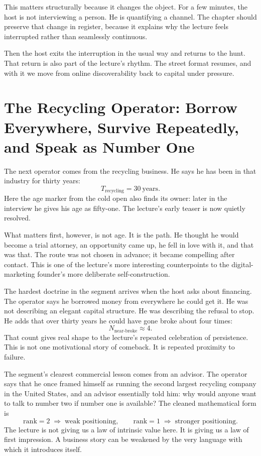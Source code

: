 This matters structurally because it changes the object. For a few minutes, the host is not interviewing a person. He is quantifying a channel. The chapter should preserve that change in register, because it explains why the lecture feels interrupted rather than seamlessly continuous.

Then the host exits the interruption in the usual way and returns to the hunt. That return is also part of the lecture's rhythm. The street format resumes, and with it we move from online discoverability back to capital under pressure.

\section{The Recycling Operator: Borrow Everywhere, Survive Repeatedly, and Speak as Number One}

The next operator comes from the recycling business. He says he has been in that industry for thirty years:
\begin{equation}
T_{\text{recycling}} = 30\ \text{years}.
\end{equation}
Here the age marker from the cold open also finds its owner: later in the interview he gives his age as fifty-one. The lecture's early teaser is now quietly resolved.

What matters first, however, is not age. It is the path. He thought he would become a trial attorney, an opportunity came up, he fell in love with it, and that was that. The route was not chosen in advance; it became compelling after contact. This is one of the lecture's more interesting counterpoints to the digital-marketing founder's more deliberate self-construction.

The hardest doctrine in the segment arrives when the host asks about financing. The operator says he borrowed money from everywhere he could get it. He was not describing an elegant capital structure. He was describing the refusal to stop. He adds that over thirty years he could have gone broke about four times:
\begin{equation}
N_{\text{near-broke}} \approx 4.
\end{equation}
That count gives real shape to the lecture's repeated celebration of persistence. This is not one motivational story of comeback. It is repeated proximity to failure.

The segment's clearest commercial lesson comes from an advisor. The operator says that he once framed himself as running the second largest recycling company in the United States, and an advisor essentially told him: why would anyone want to talk to number two if number one is available? The cleaned mathematical form is
\begin{equation}
\text{rank}=2 \;\Rightarrow\; \text{weak positioning},
\qquad
\text{rank}=1 \;\Rightarrow\; \text{stronger positioning}.
\end{equation}
The lecture is not giving us a law of intrinsic value here. It is giving us a law of first impression. A business story can be weakened by the very language with which it introduces itself.

